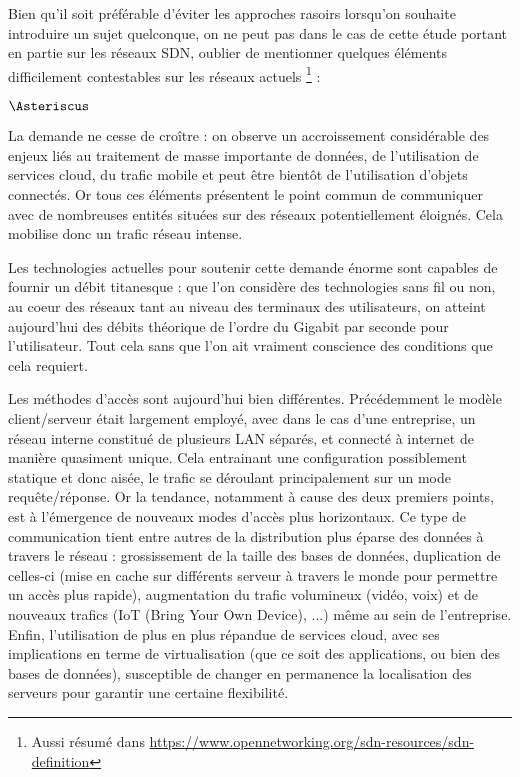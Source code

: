 Bien qu'il soit préférable d'éviter les approches rasoirs lorsqu'on souhaite introduire un sujet quelconque, on ne peut pas dans le cas de cette étude portant en partie sur les réseaux SDN, oublier de mentionner quelques éléments difficilement contestables sur les réseaux actuels \footnote{\label{of_def}Aussi résumé dans \url{https://www.opennetworking.org/sdn-resources/sdn-definition}} :

\begin{list}{$\Asteriscus$}{}

\item La demande ne cesse de croître : on observe un accroissement considérable des enjeux liés au traitement de masse importante de données, de l'utilisation de services cloud, du trafic mobile et peut être bientôt de l'utilisation d'objets connectés. Or tous ces éléments présentent le point commun de communiquer avec de nombreuses entités situées sur des réseaux potentiellement éloignés. Cela mobilise donc un trafic réseau intense.

\item Les technologies actuelles pour soutenir cette demande énorme sont capables de fournir un débit titanesque : que l'on considère des technologies sans fil ou non, au coeur des réseaux tant au niveau des terminaux des utilisateurs, on atteint aujourd'hui des débits théorique de l'ordre du Gigabit par seconde pour l'utilisateur. Tout cela sans que l'on ait vraiment conscience des conditions que cela requiert.

\item Les méthodes d'accès sont aujourd'hui bien différentes. Précédemment le modèle client/serveur était largement employé, avec dans le cas d'une entreprise, un réseau interne constitué de plusieurs LAN séparés, et connecté à internet de manière quasiment unique. Cela entrainant une configuration possiblement statique et donc aisée, le trafic se déroulant principalement sur un mode requête/réponse. Or la tendance, notamment à cause des deux premiers points, est à l'émergence de nouveaux modes d'accès plus horizontaux. Ce type de communication tient entre autres de la distribution plus éparse des données à travers le réseau : grossissement de la taille des bases de données, duplication de celles-ci (mise en cache sur différents serveur à travers le monde pour permettre un accès plus rapide), augmentation du trafic volumineux (vidéo, voix) et de nouveaux trafics (IoT (Bring Your Own Device), ...) même au sein de l'entreprise. Enfin, l'utilisation de plus en plus répandue de services cloud, avec ses implications en terme de virtualisation (que ce soit des applications, ou bien des bases de données), susceptible de changer en permanence la localisation des serveurs pour garantir une certaine flexibilité.

\end{list}

